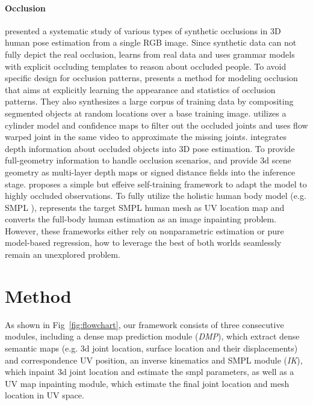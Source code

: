 \documentclass[10pt,twocolumn,letterpaper]{article}
\begin{document}
\paragraph{Occlusion} \cite{howrobust}
presented a systematic study of various types of synthetic
occlusions in 3D human pose estimation from a single RGB
image. Since synthetic data can not fully depict the real occlusion, \cite{objectdetectiongrammarmodels} learns from real data and uses
grammar models with explicit occluding templates to reason about occluded people. To avoid specific design for
occlusion patterns, \cite{parseoccludepeople} presents a method for modeling occlusion that aims at explicitly learning the appearance
and statistics of occlusion patterns. They also synthesizes a large corpus of training data by compositing segmented objects at random locations over a base training image. \cite{occlusionawarevideo} utilizes a cylinder model and confidence maps to filter out the occluded joints and uses flow warped joint in the same video to approximate the missing joints. \cite{depthocclusion} integrates depth
information about occluded objects into 3D pose estimation. To provide full-geometry information to handle occlusion scenarios, \cite{gpa} and \cite{prox} provide 3d scene geometry as multi-layer depth maps or signed distance fields into the inference stage. \cite{partialobservation} proposes a simple but effeive self-training framework to adapt the model to highly occluded observations. To fully utilize the holistic human body model (e.g. SMPL \cite{smpl}), \cite{3DOH} represents the target SMPL human mesh as UV location map and converts the full-body human estimation as an image inpainting problem. However, these frameworks either rely on nonparametric estimation or pure model-based regression, how to leverage the best of both worlds seamlessly remain an unexplored problem.

\section{Method}
As shown in Fig~\ref{fig:flowchart}, our framework consists of three consecutive modules, including a dense map prediction module (\textit{DMP}), which extract dense semantic maps (e.g. 3d joint location, surface location and their displacements) and correspondence UV position, an inverse kinematics and SMPL module (\textit{IK}), which inpaint 3d joint location and estimate the smpl parameters, as well as a UV map inpainting module, which estimate the final joint location and mesh location in UV space. 
\end{document}
